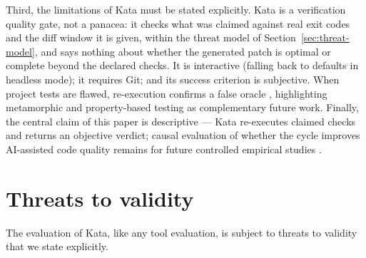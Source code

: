 \documentclass[11pt]{article}
\begin{document}
Third, the limitations of Kata must be stated explicitly. Kata is a
verification quality gate, not a panacea: it checks what was claimed against
real exit codes and the diff window it is given, within the threat model of
Section~\ref{sec:threat-model}, and says nothing about whether the generated
patch is optimal or complete beyond the declared checks. It is
interactive (falling back to defaults in headless mode); it requires Git;
and its success criterion is subjective. When project tests are flawed,
re-execution confirms a false oracle \cite{barr-oracle}, highlighting
metamorphic and property-based testing \cite{chen-metamorphic} as complementary
future work. Finally, the central claim of this paper is descriptive --- Kata
re-executes claimed checks and returns an objective verdict; causal evaluation
of whether the cycle improves AI-assisted code quality remains for future
controlled empirical studies \cite{fable}.

\section{Threats to validity}
\label{sec:threats}

The evaluation of Kata, like any tool evaluation, is subject to threats to
validity that we state explicitly.
\end{document}
